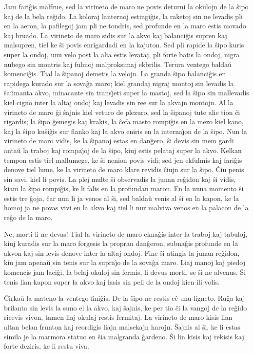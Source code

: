    Jam fari\^gis malfrue, sed la virineto de maro ne povis deturni
la okulojn de la \^sipo kaj de la bela re\^gido. La koloraj
lanternoj estingi\^gis, la raketoj sin ne levadis pli en la aeron,
la pafilegoj jam pli ne tondris, sed profunde en la maro estis
movado kaj bruado. La virineto de maro sidis sur la akvo kaj
balanci\^gis supren kaj malsupren, tiel ke \^si povis enrigardadi en
la kajuton. Sed pli rapide la \^sipo kuris super la ondoj, unu velo
post la alia estis levataj, pli forte batis la ondoj, nigra nubego
sin montris kaj fulmoj malproksimaj ekbrilis. Terura ventego balda\u
u komenci\^gis. Tial la \^sipanoj demetis la velojn. La granda
\^sipo balanci\^gis en rapidega kurado sur la sova\^ga maro; kiel
grandaj nigraj montoj sin levadis la \^sa\u umanta akvo, minacante
sin trans\^{\j}eti super la mastoj, sed la \^sipo sin mallevadis
kiel cigno inter la altaj ondoj kaj levadis sin ree sur la akvajn
montojn. Al la virineto de maro \^gi \^sajnis kiel veturo de
plezuro, sed la \^sipanoj tute alie tion \^ci rigardis; la \^sipo
\^gemegis kaj krakis, la \^cefa masto rompi\^gis en la mezo kiel
kano, kaj la \^sipo ku\^si\^gis sur flanko kaj la akvo eniris en la
interna\^{\j}on de la \^sipo. Nun la virineto de maro vidis, ke la
\^sipanoj estas en dan\^gero, \^si devis sin mem gardi anta\u u la
traboj kaj rompa\^{\j}oj de la \^sipo, kiuj estis pelataj super la
akvo. Kelkan tempon estis tiel mallumege, ke \^si nenion povis vidi;
sed jen ekfulmis kaj fari\^gis denove tiel lume, ke la virineto de
maro klare revidis \^ciujn sur la \^sipo. \^Ciu penis sin savi, kiel
li povis. La plej multe \^si observadis la junan re\^gidon kaj \^si
vidis, kiam la \^sipo rompi\^gis, ke li falis en la profundan maron.
En la unua momento \^si estis tre \^goja, \^car nun li ja venos al
\^si, sed balda\u u venis al \^si en la kapon, ke la homoj ja ne
povas vivi en la akvo kaj tiel li nur malviva venos en la palacon de
la re\^go de la maro.

   Ne, morti li ne devas! Tial la virineto de maro ekna\^gis inter
la traboj kaj tabuloj, kiuj kuradis sur la maro forgesis la propran
dan\^geron, subna\^gis profunde en la akvon kaj sin levis denove
inter la altaj ondoj. Fine \^si atingis la junan re\^gidon, kiu jam
apena\u u sin tenis sur la supra\^{\j}o de la sova\^ga maro. Liaj
manoj kaj piedoj komencis jam laci\^gi, la belaj okuloj sin fermis,
li devus morti, se \^si ne alvenus. \^Si tenis lian kapon super la
akvo kaj lasis sin peli de la ondoj kien ili volis.

   \^Cirka\u u la mateno la ventego fini\^gis. De la \^sipo ne restis e\^c unu
ligneto. Ru\^ga kaj brilanta sin levis la suno el la akvo, kaj
\^sajnis, ke per tio \^ci la vangoj de la re\^gido ricevis vivon,
tamen liaj okulaj restis fermitaj. La virineto de maro kisis lian
altan belan frunton kaj reordigis liajn malsekajn harojn. \^Sajnis
al \^si, ke li estas simila je la marmora statuo en \^sia malgranda
\^gardeno. \^Si lin kisis kaj rekisis kaj forte deziris, ke li restu
viva.

